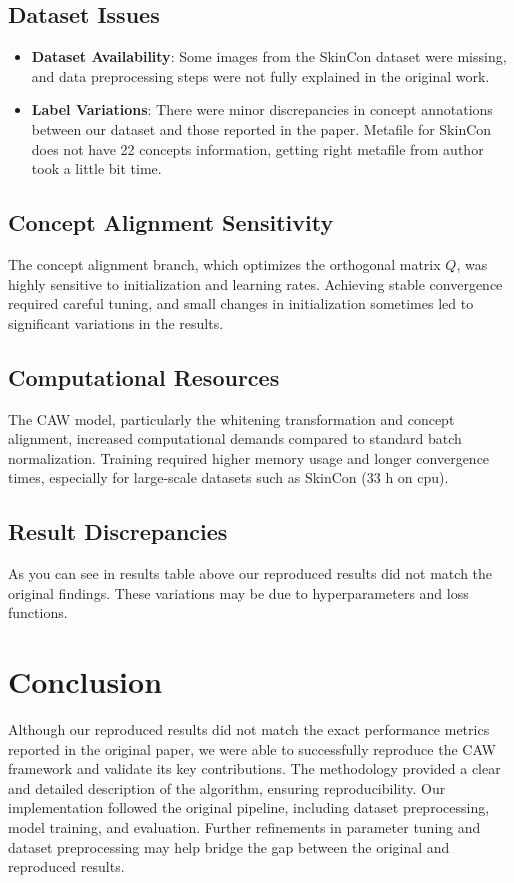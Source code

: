 \documentclass[a4paper,11pt]{article}
\begin{document}
        \subsection{Dataset Issues}
        \begin{itemize}
            \item \textbf{Dataset Availability}: Some images from the SkinCon dataset were missing, and data preprocessing steps were not fully explained in the original work.
            \item \textbf{Label Variations}: There were minor discrepancies in concept annotations between our dataset and those reported in the paper. Metafile for SkinCon does not have 22 concepts information, getting right metafile from author took a little bit time.
        \end{itemize}
        
        \subsection{Concept Alignment Sensitivity}
        The concept alignment branch, which optimizes the orthogonal matrix \( Q \), was highly sensitive to initialization and learning rates. Achieving stable convergence required careful tuning, and small changes in initialization sometimes led to significant variations in the results.
        
        \subsection{Computational Resources}
        The CAW model, particularly the whitening transformation and concept alignment, increased computational demands compared to standard batch normalization. Training required higher memory usage and longer convergence times, especially for large-scale datasets such as SkinCon (33 h on cpu).
        
        \subsection{Result Discrepancies}
        As you can see in results table above our reproduced results did not match the original findings. These variations may be due to hyperparameters and loss functions.

\section{Conclusion}
Although our reproduced results did not match the exact performance metrics reported in the original paper, we were able to successfully reproduce the CAW framework and validate its key contributions. The methodology provided a clear and detailed description of the algorithm, ensuring reproducibility. Our implementation followed the original pipeline, including dataset preprocessing, model training, and evaluation. Further refinements in parameter tuning and dataset preprocessing may help bridge the gap between the original and reproduced results.





\end{document}
